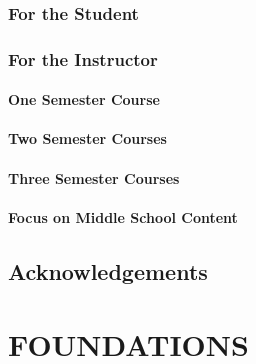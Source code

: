 \documentclass[
]{book}
\theoremstyle{definition}
\theoremstyle{definition}
\theoremstyle{definition}
\theoremstyle{definition}
\theoremstyle{remark}
\begin{document}
\hypertarget{for-the-student}{%
\section*{For the Student}\label{for-the-student}}

\hypertarget{for-the-instructor}{%
\section*{For the Instructor}\label{for-the-instructor}}

\hypertarget{one-semester-course}{%
\subsection*{One Semester Course}\label{one-semester-course}}

\hypertarget{two-semester-courses}{%
\subsection*{Two Semester Courses}\label{two-semester-courses}}

\hypertarget{three-semester-courses}{%
\subsection*{Three Semester Courses}\label{three-semester-courses}}

\hypertarget{focus-on-middle-school-content}{%
\subsection*{Focus on Middle School Content}\label{focus-on-middle-school-content}}

\hypertarget{acknowledgements}{%
\chapter*{Acknowledgements}\label{acknowledgements}}

\hypertarget{part-foundations}{%
\part{FOUNDATIONS}\label{part-foundations}}
\end{document}
